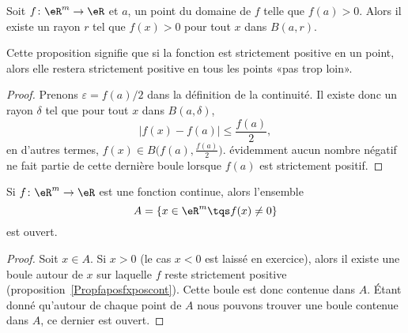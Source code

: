 \begin{proposition}		\label{Propfaposfxposcont}
	Soit $f\colon \eR^m\to \eR$ et $a$, un point du domaine de $f$ telle que $f(a)>0$. Alors il existe un rayon $r$ tel que $f(x)>0$ pour tout $x$ dans $B(a,r)$.
\end{proposition}
Cette proposition signifie que si la fonction est strictement positive en un point, alors elle restera strictement positive en tous les points «pas trop loin».

\begin{proof}
	Prenons $\varepsilon=f(a)/2$ dans la définition de la continuité. Il existe donc un rayon $\delta$ tel que pour tout $x$ dans $B(a,\delta)$,
	\begin{equation}
		| f(x)-f(a) |\leq \frac{ f(a) }{2},
	\end{equation}
	en d'autres termes, $f(x)\in B\big( f(a),\frac{ f(a) }{ 2 } \big)$. évidemment aucun nombre négatif ne fait partie de cette dernière boule lorsque $f(a)$ est strictement positif.
\end{proof}

\begin{corollary}		\label{CorfneqzOuvert}
	Si $f\colon \eR^m\to \eR$ est une fonction continue, alors l'ensemble
	\begin{equation}
		A=\{ x\in\eR^m\tqs f(x)\neq 0 \}
	\end{equation}
	est ouvert.
\end{corollary}

\begin{proof}
	Soit $x\in A$. Si $x>0$ (le cas $x<0$ est laissé en exercice), alors il existe une boule autour de $x$ sur laquelle $f$ reste strictement positive (proposition~\ref{Propfaposfxposcont}). Cette boule est donc contenue dans $A$. Étant donné qu'autour de chaque point de $A$ nous pouvons trouver une boule contenue dans $A$, ce dernier est ouvert.
\end{proof}

